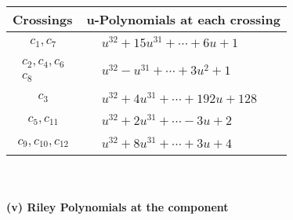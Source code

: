 \documentclass[1p]{elsarticle_modified}
\theoremstyle{definition}
\begin{document}
\begin{tabular}{m{50pt}|m{274pt}}
Crossings & \hspace{64pt}u-Polynomials at each crossing \\
\hline $$\begin{aligned}c_{1},c_{7}\end{aligned}$$&$\begin{aligned}
&u^{32}+15 u^{31}+\cdots+6 u+1
\end{aligned}$\\
\hline $$\begin{aligned}c_{2},c_{4},c_{6}\\c_{8}\end{aligned}$$&$\begin{aligned}
&u^{32}- u^{31}+\cdots+3 u^2+1
\end{aligned}$\\
\hline $$\begin{aligned}c_{3}\end{aligned}$$&$\begin{aligned}
&u^{32}+4 u^{31}+\cdots+192 u+128
\end{aligned}$\\
\hline $$\begin{aligned}c_{5},c_{11}\end{aligned}$$&$\begin{aligned}
&u^{32}+2 u^{31}+\cdots-3 u+2
\end{aligned}$\\
\hline $$\begin{aligned}c_{9},c_{10},c_{12}\end{aligned}$$&$\begin{aligned}
&u^{32}+8 u^{31}+\cdots+3 u+4
\end{aligned}$\\
\hline
\end{tabular}\\~\\
\newpage\renewcommand{\arraystretch}{1}
\flushleft \textbf{(v) Riley Polynomials at the component}\newline \\
\end{document}
